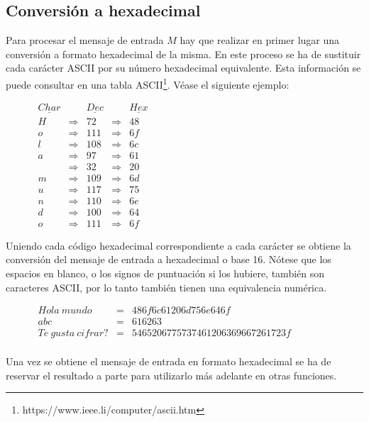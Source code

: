 \documentclass{article}
\begin{document}
    \subsection{Conversión a hexadecimal}
        Para procesar el mensaje de entrada $M$ hay que realizar en primer lugar una conversión a formato hexadecimal de la misma. En este proceso se ha de sustituir cada carácter ASCII por su número hexadecimal equivalente. Esta información se puede consultar en una tabla ASCII\footnote{https://www.ieee.li/computer/ascii.htm}. Véase el siguiente ejemplo:
            \begin{figure}[H]
            \centering
                $\begin{array}{lclcl}
                \underline{Char} &  & \underline{Dec} &  & \underline{Hex} \\
                H & \Rightarrow & 72 & \Rightarrow & 48 \\
                o & \Rightarrow & 111 & \Rightarrow & 6f \\
                l & \Rightarrow & 108 & \Rightarrow & 6c \\
                a & \Rightarrow & 97 & \Rightarrow & 61 \\
                  & \Rightarrow & 32 & \Rightarrow & 20 \\
                m & \Rightarrow & 109 & \Rightarrow & 6d \\
                u & \Rightarrow & 117 & \Rightarrow & 75 \\
                n & \Rightarrow & 110 & \Rightarrow & 6e \\
                d & \Rightarrow & 100 & \Rightarrow & 64 \\
                o & \Rightarrow & 111 & \Rightarrow & 6f
                \end{array}$
            \end{figure}
        Uniendo cada código hexadecimal correspondiente a cada carácter se obtiene la conversión del mensaje de entrada a hexadecimal o base 16. Nótese que los espacios en blanco, o los signos de puntuación si los hubiere, también son caracteres ASCII, por lo tanto también tienen una equivalencia numérica.
            \begin{figure}[H]
            \centering
                $\begin{array}{rcl}
                    Hola \ mundo & = & 486f6c61206d756e646f \\
                    abc & = & 616263 \\
                    Te \ gusta \ cifrar? & = & 5465206775737461206369667261723f \\
                \end{array}$
            \end{figure}
        Una vez se obtiene el mensaje de entrada en formato hexadecimal se ha de reservar el resultado a parte para utilizarlo más adelante en otras funciones.
\end{document}
